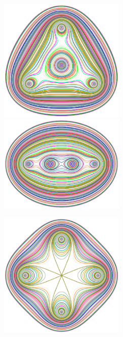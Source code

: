 \documentclass{article}
\begin{document}
\begin{exa}
\begin{figure}[H]
\begin{minipage}{0.5\hsize}
\begin{center}
\includegraphics[width=6cm]{cassini4_omusubi.eps}
\caption{}
\label{ }
\end{center}
\end{minipage}
\begin{minipage}{0.5\hsize}
\begin{center}
\includegraphics[width=6cm]{cassini4_aligned.eps}
\caption{}
\label{ }
\end{center}
\end{minipage}
\end{figure}
\begin{figure}[H]
\begin{center}
\includegraphics[width=6cm]{cassini4_clover.eps}
\caption{}
\label{ }
\end{center}
\end{figure}
\end{exa}
\end{document}

